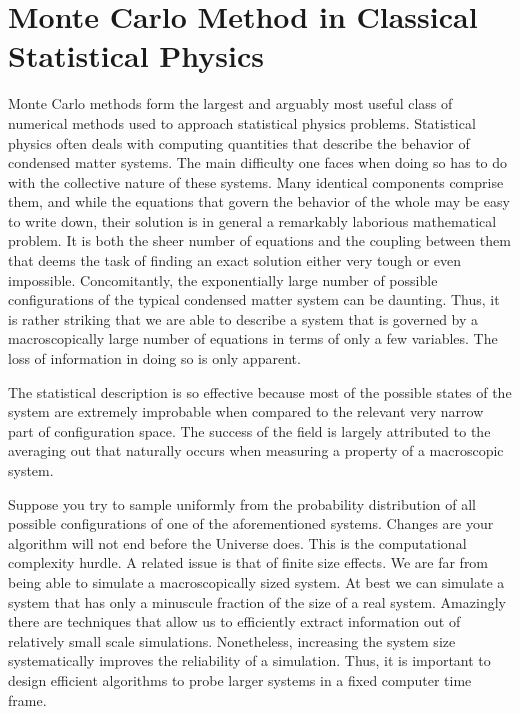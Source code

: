 \section{Monte Carlo Method in Classical Statistical Physics}
\label{sec:classical_mc}

Monte Carlo methods form the largest and arguably most useful class of numerical methods used to approach statistical physics problems.
Statistical physics often deals with computing quantities that describe the behavior of condensed matter systems.
The main difficulty one faces when doing so has to do with the collective nature of these systems.
Many identical components comprise them, and while the equations that govern the behavior of the whole may be easy to write down, their solution is in general a remarkably laborious mathematical problem.
It is both the sheer number of equations and the coupling between them that deems the task of finding an exact solution either very tough or even impossible.
Concomitantly, the exponentially large number of possible configurations of the typical condensed matter system can be daunting.
Thus, it is rather striking that we are able to describe a system that is governed by a macroscopically large number of equations in terms of only a few variables.
The loss of information in doing so is only apparent.

The statistical description is so effective because most of the possible states of the system are extremely improbable when compared to the relevant very narrow part of configuration space.
The success of the field is largely attributed to the averaging out that naturally occurs when measuring a property of a macroscopic system.

Suppose you try to sample uniformly from the probability distribution of all possible configurations of one of the aforementioned systems.
Changes are your algorithm will not end before the Universe does.
This is the computational complexity hurdle.
A related issue is that of finite size effects.
We are far from being able to simulate a macroscopically sized system. 
At best we can simulate a system that has only a minuscule fraction of the size of a real system.
Amazingly there are techniques that allow us to efficiently extract information out of relatively small scale simulations.
Nonetheless, increasing the system size systematically improves the reliability of a simulation.
Thus, it is important to design efficient algorithms to probe larger  systems in a fixed computer time frame.

